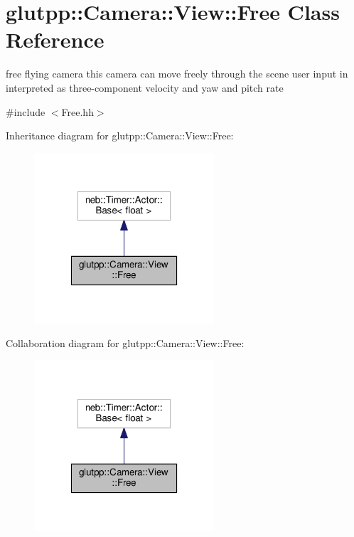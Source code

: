 \hypertarget{classglutpp_1_1Camera_1_1View_1_1Free}{\section{glutpp\-:\-:Camera\-:\-:View\-:\-:Free Class Reference}
\label{classglutpp_1_1Camera_1_1View_1_1Free}
}


free flying camera this camera can move freely through the scene user input in interpreted as three-\/component velocity and yaw and pitch rate  




{\ttfamily \#include $<$Free.\-hh$>$}



Inheritance diagram for glutpp\-:\-:Camera\-:\-:View\-:\-:Free\-:
\nopagebreak
\begin{figure}[H]
\begin{center}
\leavevmode
\includegraphics[width=190pt]{classglutpp_1_1Camera_1_1View_1_1Free__inherit__graph}
\end{center}
\end{figure}


Collaboration diagram for glutpp\-:\-:Camera\-:\-:View\-:\-:Free\-:
\nopagebreak
\begin{figure}[H]
\begin{center}
\leavevmode
\includegraphics[width=190pt]{classglutpp_1_1Camera_1_1View_1_1Free__coll__graph}
\end{center}
\end{figure}
